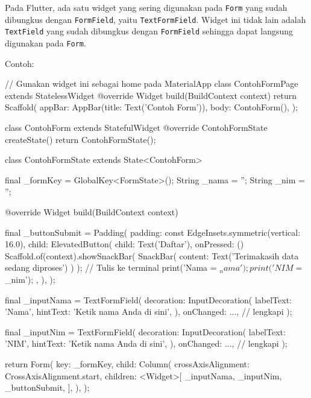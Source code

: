 \documentclass[a4paper,11pt]{article} %
\newcommand{\txtinline}[1]{\texttt{#1}}
\begin{document}
Pada Flutter, ada satu widget yang sering digunakan pada \txtinline{Form} yang sudah
dibungkus dengan \txtinline{FormField}, yaitu \txtinline{TextFormField}. Widget ini
tidak lain adalah \txtinline{TextField} yang sudah dibungkus dengan \txtinline{FormField}
sehingga dapat langsung digunakan pada \txtinline{Form}.

Contoh:
\begin{dartcode}

// Gunakan widget ini sebagai home pada MaterialApp
class ContohFormPage extends StatelessWidget {
  @override
  Widget build(BuildContext context) {
    return Scaffold(
      appBar: AppBar(title: Text('Contoh Form')),
      body: ContohForm(),
    );
  }
}

class ContohForm extends StatefulWidget {
  @override
  ContohFormState createState() {
    return ContohFormState();
  }
}
  
class ContohFormState extends State<ContohForm> {
  
  final _formKey = GlobalKey<FormState>();
  String _nama = '';
  String _nim = ''; 
  
  @override
  Widget build(BuildContext context) {
  
    final _buttonSubmit = Padding(
      padding: const EdgeInsets.symmetric(vertical: 16.0),
      child: ElevatedButton(
        child: Text('Daftar'),
        onPressed: () {
          Scaffold.of(context).showSnackBar(
            SnackBar(
              content: Text('Terimakasih data sedang diproses')
            )
          );
          // Tulis ke terminal
          print('Nama = $_nama');
          print('NIM  = $_nim');
        },
      ),
    );
  
    final _inputNama = TextFormField(
      decoration: InputDecoration(
        labelText: 'Nama',
        hintText: 'Ketik nama Anda di sini',
      ),
      onChanged: ..., // lengkapi
    );
  
    final _inputNim = TextFormField(
      decoration: InputDecoration(
        labelText: 'NIM',
        hintText: 'Ketik nama Anda di sini',
      ),
      onChanged: ..., // lengkapi
    );

    return Form(
      key: _formKey,
      child: Column(
        crossAxisAlignment: CrossAxisAlignment.start,
        children: <Widget>[
          _inputNama,
          _inputNim,
          _buttonSubmit,
        ],
      ),
    );
  }
}
\end{dartcode}
\end{document}

